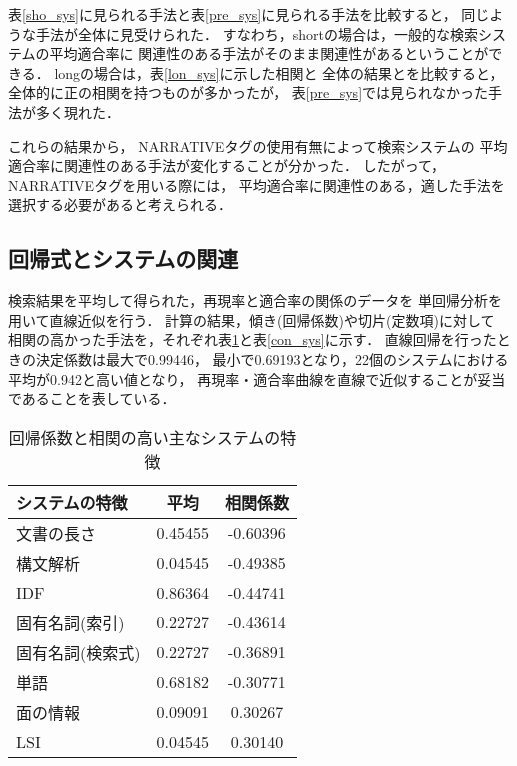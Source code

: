 表\ref{sho_sys}に見られる手法と表\ref{pre_sys}に見られる手法を比較すると，
同じような手法が全体に見受けられた．
すなわち，shortの場合は，一般的な検索システムの平均適合率に
関連性のある手法がそのまま関連性があるということができる．
longの場合は，表\ref{lon_sys}に示した相関と
全体の結果とを比較すると，全体的に正の相関を持つものが多かったが，
表\ref{pre_sys}では見られなかった手法が多く現れた．
 	
これらの結果から， NARRATIVEタグの使用有無によって検索システムの
平均適合率に関連性のある手法が変化することが分かった．
したがって，NARRATIVEタグを用いる際には，
平均適合率に関連性のある，適した手法を選択する必要があると考えられる．

\subsection{回帰式とシステムの関連}
検索結果を平均して得られた，再現率と適合率の関係のデータを
単回帰分析を用いて直線近似を行う．
計算の結果，傾き(回帰係数)や切片(定数項)に対して
相関の高かった手法を，それぞれ表\ref{coe_sys}と表\ref{con_sys}に示す．
直線回帰を行ったときの決定係数は最大で0.99446，
最小で0.69193となり，22個のシステムにおける平均が0.942と高い値となり，
再現率・適合率曲線を直線で近似することが妥当であることを表している．

\begin{table}[htb]
\renewcommand{\arraystretch}{}
\caption{回帰係数と相関の高い主なシステムの特徴}
\centering
\small
\label{coe_sys}
\begin{tabular}{lcc} 
システムの特徴 		&   平均  & 相関係数 \\ \hline
文書の長さ		& 0.45455 & -0.60396 \\
構文解析		& 0.04545 & -0.49385 \\
IDF		 	& 0.86364 & -0.44741 \\
固有名詞(索引)		& 0.22727 & -0.43614 \\
固有名詞(検索式)	& 0.22727 & -0.36891 \\
単語	 		& 0.68182 & -0.30771 \\
面の情報	 	& 0.09091 &  0.30267 \\
LSI	 		& 0.04545 &  0.30140 \\ \hline
\end{tabular}
\end{table}

